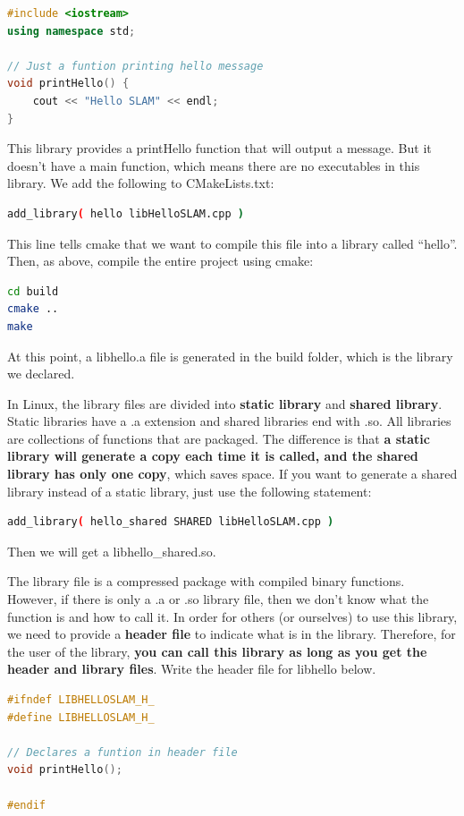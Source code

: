 \begin{lstlisting}[language=c++,caption=slambook2/ch2/libHelloSLAM.cpp]
#include <iostream>
using namespace std;

// Just a funtion printing hello message
void printHello() {
    cout << "Hello SLAM" << endl;
}
\end{lstlisting}
This library provides a printHello function that will output a message. But it doesn't have a main function, which means there are no executables in this library. We add the following to CMakeLists.txt:
\begin{lstlisting}[language=sh,caption=slambook2/ch2/CMakeLists.txt]
add_library( hello libHelloSLAM.cpp )
\end{lstlisting}
This line tells cmake that we want to compile this file into a library called ``hello''. Then, as above, compile the entire project using cmake:
\begin{lstlisting}[language=sh,caption=Terminal input]
cd build
cmake ..
make
\end{lstlisting}
At this point, a libhello.a file is generated in the build folder, which is the library we declared.

In Linux, the library files are divided into \textbf{static library} and \textbf{shared library}. Static libraries have a .a extension and shared libraries end with .so. All libraries are collections of functions that are packaged. The difference is that \textbf{a static library will generate a copy each time it is called, and the shared library has only one copy}, which saves space. If you want to generate a shared library instead of a static library, just use the following statement:

\begin{lstlisting}[language=sh,caption=slambook2/ch2/CMakeLists.txt]
add_library( hello_shared SHARED libHelloSLAM.cpp )
\end{lstlisting}
Then we will get a libhello\_shared.so.

The library file is a compressed package with compiled binary functions. However, if there is only a .a or .so library file, then we don't know what the function is and how to call it. In order for others (or ourselves) to use this library, we need to provide a \textbf{header file} to indicate what is in the library. Therefore, for the user of the library, \textbf{you can call this library as long as you get the header and library files}. Write the header file for libhello below.

\begin{lstlisting}[language=c++,caption=slambook2/ch2/libHelloSLAM.h]
#ifndef LIBHELLOSLAM_H_
#define LIBHELLOSLAM_H_

// Declares a funtion in header file
void printHello();

#endif
\end{lstlisting}

